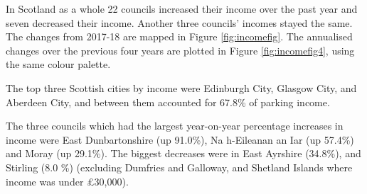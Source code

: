 \documentclass[
  12pt,
]{article}
\begin{document}
In Scotland as a whole 22 councils increased their income over the past year and seven decreased their income. Another three councils' incomes stayed the same.
The changes from 2017-18 are mapped in Figure \ref{fig:incomefig}. The annualised changes over the previous four years are plotted in Figure \ref{fig:incomefig4}, using the same colour palette.

The top three Scottish cities by income were Edinburgh City, Glasgow City, and Aberdeen City, and between them accounted for 67.8\% of parking income.

The three councils which had the largest year-on-year percentage increases in income were East Dunbartonshire (up 91.0\%), Na h-Eileanan an Iar (up 57.4\%) and Moray (up 29.1\%).
The biggest decreases were in East Ayrshire (34.8\%), and Stirling (8.0 \%) (excluding Dumfries and Galloway, and Shetland Islands where income was under £30,000).

\begingroup\fontsize{9}{11}\selectfont
\end{document}
